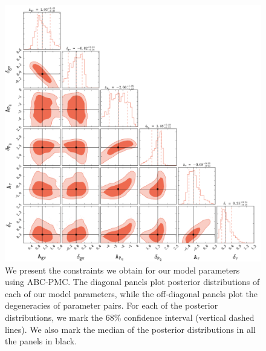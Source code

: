 \documentclass[iop,apj,tighten,twocolappendix,numberedappendix]{emulateapj}
\begin{document}
\begin{figure}
\begin{center}
\includegraphics[scale=0.5]{figs/abc_step7_multifq_wideprior_unweighted.pdf}
\caption{We present the constraints we obtain for our model parameters using ABC-PMC. 
The diagonal panels plot posterior distributions of each of our model parameters, while
the off-diagonal panels plot the degeneracies of parameter pairs. For each of the posterior
distributions, we mark the $68\%$ confidence interval (vertical dashed lines). We also 
mark the median of the posterior distributions in all the panels in black.}
\label{fig:abc_post}
\end{center}
\end{figure}
\end{document}
